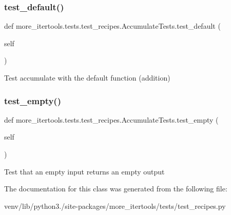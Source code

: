 \subsubsection{\texorpdfstring{test\+\_\+default()}{test\_default()}}
{\footnotesize\ttfamily def more\+\_\+itertools.\+tests.\+test\+\_\+recipes.\+Accumulate\+Tests.\+test\+\_\+default (\begin{DoxyParamCaption}\item[{}]{self }\end{DoxyParamCaption})}

\begin{DoxyVerb}Test accumulate with the default function (addition)\end{DoxyVerb}
 \mbox{\label{classmore__itertools_1_1tests_1_1test__recipes_1_1_accumulate_tests_a3d36688fd6a5585b815b5ffa77d66d7d}} 
\subsubsection{\texorpdfstring{test\+\_\+empty()}{test\_empty()}}
{\footnotesize\ttfamily def more\+\_\+itertools.\+tests.\+test\+\_\+recipes.\+Accumulate\+Tests.\+test\+\_\+empty (\begin{DoxyParamCaption}\item[{}]{self }\end{DoxyParamCaption})}

\begin{DoxyVerb}Test that an empty input returns an empty output\end{DoxyVerb}
 

The documentation for this class was generated from the following file\+:\begin{DoxyCompactItemize}
\item 
venv/lib/python3./site-\/packages/more\+\_\+itertools/tests/test\+\_\+recipes.\+py\end{DoxyCompactItemize}
